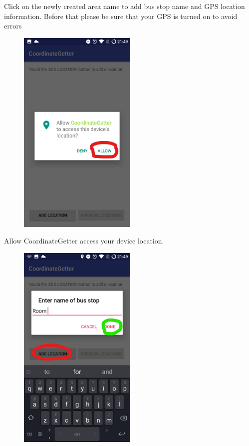 \documentclass[fontsize=25pt]{scrbook}
\begin{document}
	Click on the newly created area name to add bus stop name and GPS location information. Before that please be sure that your GPS is turned on to avoid errors
	\newpage
	\begin{center}
\begin{figure}
		\includegraphics[height=10cm]{Screenshot_13_LI.jpg}
		
		\end{figure}
	\end{center}
	Allow CoordinateGetter access your device location.
	\newpage
	\begin{center}
\begin{figure}
		\includegraphics[height=10cm]{Screenshot_14_LI.jpg}
		
		\end{figure}
	\end{center}
\end{document}
